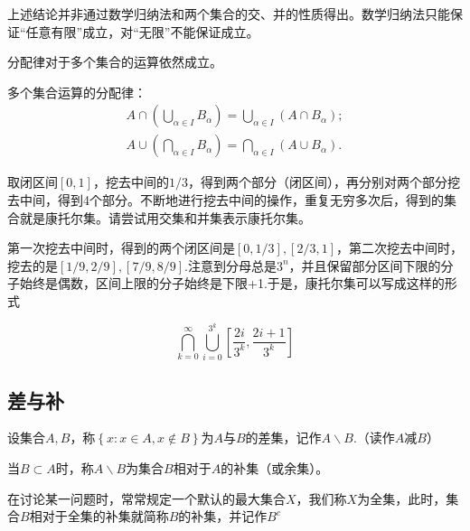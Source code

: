 \begin{remark}
上述结论并非通过数学归纳法和两个集合的交、并的性质得出。数学归纳法只能保证“任意有限”成立，对“无限”不能保证成立。
\end{remark}

分配律对于多个集合的运算依然成立。

\begin{theorem}
    多个集合运算的分配律：
    \begin{equation}
    \begin{split}
        A\cap \left(\bigcup_{\alpha \in I} B_\alpha\right) = \bigcup_{\alpha \in I}(A\cap B_\alpha); \\
        A\cup \left(\bigcap_{\alpha \in I} B_\alpha\right) = \bigcap_{\alpha \in I}(A\cup B_\alpha).
    \end{split}
    \end{equation}
\end{theorem}

\begin{example}[康托尔集]
    取闭区间$[0,1]$，挖去中间的$1/3$，得到两个部分（闭区间），再分别对两个部分挖去中间，得到4个部分。不断地进行挖去中间的操作，重复无穷多次后，得到的集合就是康托尔集。请尝试用交集和并集表示康托尔集。
\end{example}

第一次挖去中间时，得到的两个闭区间是$\displaystyle \left[0,1/3\right],\left[2/3,1\right]$，第二次挖去中间时，挖去的是$\left[1/9,2/9\right],\left[7/9,8/9\right]$.注意到分母总是$3^n$，并且保留部分区间下限的分子始终是偶数，区间上限的分子始终是下限+1.于是，康托尔集可以写成这样的形式

\begin{equation*}
    \bigcap_{k=0}^{\infty} \bigcup_{i=0}^{3^k} \left[\frac{2i}{3^k},\frac{2i+1}{3^k}\right]
\end{equation*}

\subsection*{差与补}

\begin{definition}[差集]
    设集合$A,B$，称$\left\{x:x\in A, x\notin B \right\}$为$A$与$B$的差集，记作$A\backslash B$.（读作$A$减$B$）

    当$B \subset A$时，称$A\backslash B$为集合$B$相对于$A$的补集（或余集）。
\end{definition}

在讨论某一问题时，常常规定一个默认的最大集合$X$，我们称$X$为全集，此时，集合$B$相对于全集的补集就简称$B$的补集，并记作$B^c$

